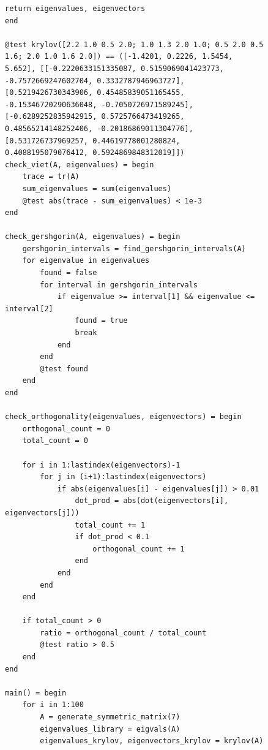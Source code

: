 \documentclass[a4paper, 14pt]{extarticle}
\begin{document}
\begin{figure}[!htb]
\begin{lstlisting}[language={},caption={Метод Крылова (продолжение)},label={lst:code6}]
    return eigenvalues, eigenvectors
end

@test krylov([2.2 1.0 0.5 2.0; 1.0 1.3 2.0 1.0; 0.5 2.0 0.5 1.6; 2.0 1.0 1.6 2.0]) == ([-1.4201, 0.2226, 1.5454, 5.652], [[-0.2220633151335087, 0.5159069041423773, -0.7572669247602704, 0.3332787946963727], [0.5219426730343906, 0.45485839051165455, -0.15346720290636048, -0.7050726971589245], [-0.6289252835942915, 0.5725766473419265, 0.48565214148252406, -0.20186869011304776], [0.531726737969257, 0.44619778001280824, 0.4088195079076412, 0.5924869848312019]])
check_viet(A, eigenvalues) = begin
    trace = tr(A)
    sum_eigenvalues = sum(eigenvalues)
    @test abs(trace - sum_eigenvalues) < 1e-3
end

check_gershgorin(A, eigenvalues) = begin
    gershgorin_intervals = find_gershgorin_intervals(A)
    for eigenvalue in eigenvalues
        found = false
        for interval in gershgorin_intervals
            if eigenvalue >= interval[1] && eigenvalue <= interval[2]
                found = true
                break
            end
        end
        @test found
    end
end

check_orthogonality(eigenvalues, eigenvectors) = begin
    orthogonal_count = 0
    total_count = 0

    for i in 1:lastindex(eigenvectors)-1
        for j in (i+1):lastindex(eigenvectors)
            if abs(eigenvalues[i] - eigenvalues[j]) > 0.01
                dot_prod = abs(dot(eigenvectors[i], eigenvectors[j]))
                total_count += 1
                if dot_prod < 0.1
                    orthogonal_count += 1
                end
            end
        end
    end

    if total_count > 0
        ratio = orthogonal_count / total_count
        @test ratio > 0.5
    end
end

main() = begin
    for i in 1:100
        A = generate_symmetric_matrix(7)
        eigenvalues_library = eigvals(A)
        eigenvalues_krylov, eigenvectors_krylov = krylov(A)
\end{lstlisting}
\end{figure}
\end{document}
